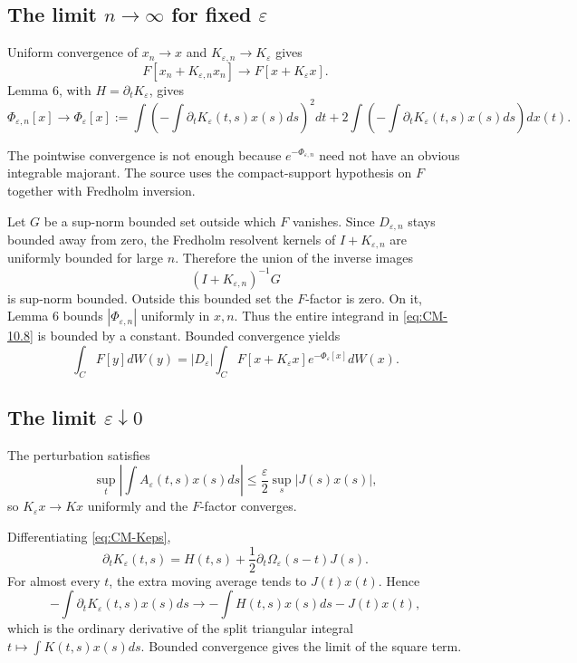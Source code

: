 \subsection{The limit \(n\to\infty\) for fixed \(\varepsilon\)}
Uniform convergence of \(x_n\to x\) and \(K_{\varepsilon,n}\to K_\varepsilon\) gives
\[
 F[x_n+K_{\varepsilon,n}x_n]
 \to F[x+K_\varepsilon x].
\]
Lemma 6, with \(H=\partial_tK_\varepsilon\), gives
\[
 \Phi_{\varepsilon,n}[x]\to
 \Phi_\varepsilon[x]
 :=\int\left(-\int\partial_tK_\varepsilon(t,s)x(s)ds\right)^2dt
 +2\int\left(-\int\partial_tK_\varepsilon(t,s)x(s)ds\right)dx(t).
\]

The pointwise convergence is not enough because \(e^{-\Phi_{\varepsilon,n}}\) need not have an obvious integrable majorant.  The source uses the compact-support hypothesis on \(F\) together with Fredholm inversion.

Let \(G\) be a sup-norm bounded set outside which \(F\) vanishes.  Since \(D_{\varepsilon,n}\) stays bounded away from zero, the Fredholm resolvent kernels of \(I+K_{\varepsilon,n}\) are uniformly bounded for large \(n\).  Therefore the union of the inverse images
\[
 (I+K_{\varepsilon,n})^{-1}G
\]
is sup-norm bounded.  Outside this bounded set the \(F\)-factor is zero.  On it, Lemma 6 bounds \(|\Phi_{\varepsilon,n}|\) uniformly in \(x,n\).  Thus the entire integrand in \eqref{eq:CM-10.8} is bounded by a constant.  Bounded convergence yields
\begin{equation}
 \int_CF[y]dW(y)
 =|D_\varepsilon|\int_CF[x+K_\varepsilon x]e^{-\Phi_\varepsilon[x]}dW(x).
 \tag{10.10}\label{eq:CM-10.10}
\end{equation}

\subsection{The limit \(\varepsilon\downarrow0\)}
The perturbation satisfies
\[
 \sup_t\left|\int A_\varepsilon(t,s)x(s)ds\right|
 \le \frac\varepsilon2\sup_s|J(s)x(s)|,
\]
so \(K_\varepsilon x\to Kx\) uniformly and the \(F\)-factor converges.

Differentiating \eqref{eq:CM-Keps},
\[
 \partial_tK_\varepsilon(t,s)
 =H(t,s)+\frac12\partial_t\Omega_\varepsilon(s-t)J(s).
\]
For almost every \(t\), the extra moving average tends to \(J(t)x(t)\).  Hence
\[
 -\int\partial_tK_\varepsilon(t,s)x(s)ds
 \longrightarrow
 -\int H(t,s)x(s)ds-J(t)x(t),
\]
which is the ordinary derivative of the split triangular integral \(t\mapsto\int K(t,s)x(s)ds\).  Bounded convergence gives the limit of the square term.

